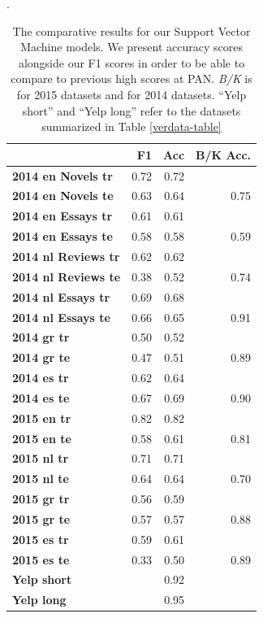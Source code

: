 \begin{table}[ht]
\caption{\label{tab:svmav} The comparative results for our Support Vector Machine models. We present accuracy scores alongside our F1 scores in order to be able to compare to previous high scores at PAN. \textit{B/K} is \citet{bagnall2015author} for 2015 datasets and \citet{khonji2014slightly} for 2014 datasets. ``Yelp short'' and ``Yelp long'' refer to the datasets summarized in Table \ref{verdata-table}}.
\begin{center}
\begin{tabular}{lrrr} 
\toprule
                       &  \bf F1 &    \bf Acc & \bf B/K Acc. \\
\midrule
\bf 2014 en Novels tr     &   0.72     & 0.72   &          \\
\bf 2014 en Novels te     &   0.63     & 0.64   &   0.75    \\
\bf 2014 en Essays tr     &   0.61     & 0.61   &           \\
\bf 2014 en Essays te     &   0.58     & 0.58   &   0.59   \\
\bf 2014 nl Reviews tr     &   0.62    & 0.62  &           \\
\bf 2014 nl Reviews te     &   0.38    & 0.52  &    0.74   \\
\bf 2014 nl Essays tr     &   0.69     & 0.68  &           \\
\bf 2014 nl Essays te     &   0.66     & 0.65  &   0.91    \\
\bf 2014 gr tr             &   0.50    & 0.52  &           \\
\bf 2014 gr te             &   0.47    & 0.51  &   0.89    \\
\bf 2014 es tr             &   0.62    & 0.64  &           \\
\bf 2014 es te             &   0.67    & 0.69  &      0.90 \\
\bf 2015 en tr             &   0.82    & 0.82  &         \\
\bf 2015 en te             &   0.58    & 0.61  &    0.81 \\
\bf 2015 nl tr             &   0.71    & 0.71  &         \\
\bf 2015 nl te             &   0.64    & 0.64  &   0.70  \\
\bf 2015 gr tr             &   0.56    & 0.59  &         \\
\bf 2015 gr te             &   0.57    & 0.57  &    0.88 \\
\bf 2015 es tr             &   0.59    & 0.61  &         \\
\bf 2015 es te             &   0.33    & 0.50  &    0.89 \\
\bf Yelp short             &           & 0.92  &         \\
\bf Yelp long              &           & 0.95  &         \\ 
\hline
\end{tabular}
\end{center}
\end{table}

